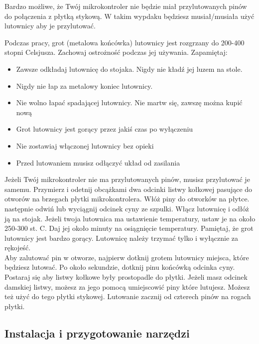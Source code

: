 \documentclass{pdfBooklets}
\begin{document}
Bardzo możliwe, że Twój mikrokontroler nie będzie miał przylutowanych pinów do połączenia z płytką stykową.
W takim wypdaku będziesz musiał/musiała użyć lutownicy aby je przylutować.\\

\begin{ProTip}{}
  Podczas pracy, grot (metalowa końcówka) lutownicy jest rozgrzany do 200-400 stopni Celsjusza. Zachowaj ostrożność
  podczas jej używania. Zapamiętaj:
  \begin{itemize}
  \item Zawsze odkładaj lutownicę do stojaka. Nigdy nie kładź jej luzem na stole.
  \item Nigdy nie łap za metalowy koniec lutownicy.
  \item Nie wolno łapać spadającej lutownicy. Nie martw się, zawszę można kupić nową
  \item Grot lutownicy jest gorący przez jakiś czas po wyłączeniu
  \item Nie zostawiaj włączonej lutownicy bez opieki
  \item Przed lutowaniem musisz odłączyć układ od zasilania
  \end{itemize}
\end{ProTip}

Jeżeli Twój mikrokontroler nie ma przylutowanych pinów, musisz przylutować je samemu. Przymierz i odetnij
obcążkami dwa odcinki listwy kołkowej pasujące do otworów na brzegach płytki mikrokontrolera. Włóż piny do otworków
na płytce. następnie odwiń lub wyciągnij odcinek cyny ze szpulki. Włącz lutownicę i odłóż ją na stojak. Jeżeli twoja lutownica
ma ustawienie temperatury, ustaw je na około 250-300 st. C. Daj jej około minuty na osiągnięcie temperatury. Pamiętaj, że grot
lutownicy jest bardzo gorący. Lutownicę należy trzymać tylko i wyłącznie za rękojeść.
\\

Aby zalutować pin w otworze, najpierw dotknij grotem lutownicy
miejsca, które będziesz lutować. Po około sekundzie, dotknij pinu końcówką odcinka cyny.
\\

Postaraj się aby listwy kołkowe były prostopadle do płytki. Jeżeli masz odcinek damskiej listwy, możesz za jego pomocą
umiejscowić piny które lutujesz. Możesz też użyć do tego płytki stykowej. Lutowanie zacznij od czterech pinów na rogach płytki.

\subsection{Instalacja i przygotowanie narzędzi}
\end{document}

